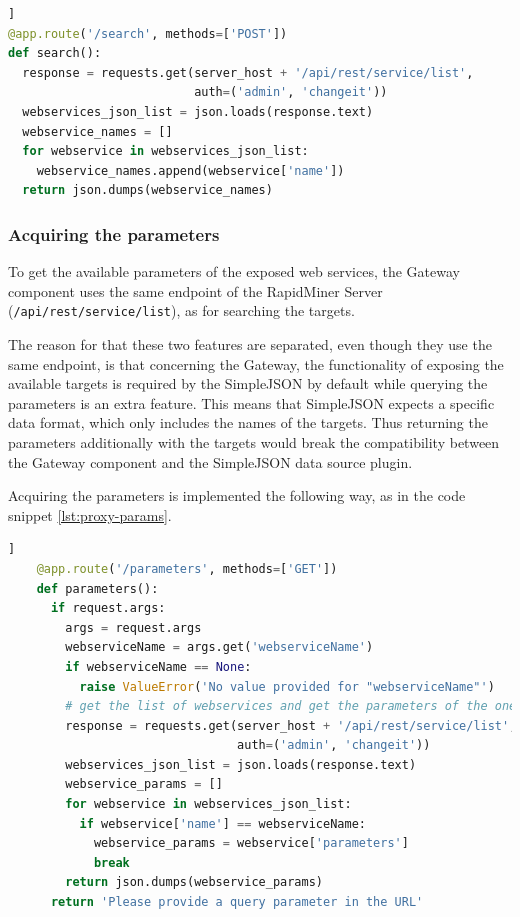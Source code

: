 \begin{minipage}{\linewidth}
\begin{lstlisting}[language=Python, caption={Get the names of the web services}, label={lst:proxy-search}]]
@app.route('/search', methods=['POST'])
def search():
  response = requests.get(server_host + '/api/rest/service/list',
                          auth=('admin', 'changeit'))
  webservices_json_list = json.loads(response.text)
  webservice_names = []
  for webservice in webservices_json_list:
    webservice_names.append(webservice['name'])
  return json.dumps(webservice_names)
\end{lstlisting}
\end{minipage}
\subsubsection{Acquiring the parameters}

To get the available parameters of the exposed web services, the Gateway component uses the same endpoint of the RapidMiner Server (\texttt{/api/rest/service/list}), as for searching the targets.

The reason for that these two features are separated, even though they use the same endpoint, is that concerning the Gateway, the functionality of exposing the available targets is required by the SimpleJSON by default while querying the parameters is an extra feature. This means that SimpleJSON expects a specific data format, which only includes the names of the targets. Thus returning the parameters additionally with the targets would break the compatibility between the Gateway component and the SimpleJSON data source plugin.

Acquiring the parameters is implemented the following way, as in the code snippet \ref{lst:proxy-params}.

\begin{minipage}{\linewidth}
	\begin{lstlisting}[language=Python, caption={Get the parameters for a given web service}, label={lst:proxy-params}]]
	@app.route('/parameters', methods=['GET'])
	def parameters():
	  if request.args:
	    args = request.args
	    webserviceName = args.get('webserviceName')
	    if webserviceName == None:
	      raise ValueError('No value provided for "webserviceName"')
	    # get the list of webservices and get the parameters of the one with the name provided in the query
	    response = requests.get(server_host + '/api/rest/service/list',
	                            auth=('admin', 'changeit'))
	    webservices_json_list = json.loads(response.text)
	    webservice_params = []
	    for webservice in webservices_json_list:
	      if webservice['name'] == webserviceName:
	        webservice_params = webservice['parameters']
	        break
	    return json.dumps(webservice_params)
	  return 'Please provide a query parameter in the URL'
	\end{lstlisting}
\end{minipage}

